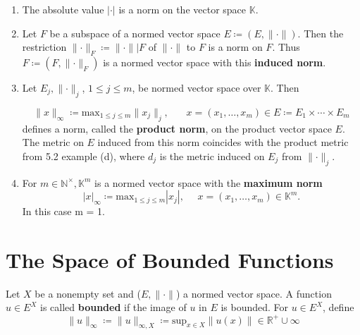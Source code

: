 \begin{eg}
    \begin{enumerate}[label=(\alph*)]
        \item The absolute value \(|\cdot|\) is a norm on the vector space \(\mathbb{K}\). 
        \item Let \(F\) be a subspace of a normed vector space 
        \(E \coloneqq \left(E, \lVert \cdot \rVert \right)\). Then the restriction 
        \(\lVert \cdot \rVert_F \coloneqq  \lVert \cdot \rVert | F\) of 
        \(\lVert \cdot \rVert\) to \(F\) is a norm on \(F\). Thus 
        \(F \coloneqq \left(F, \lVert \cdot \rVert_F\right)\) is a normed vector space 
        with this \textbf{induced norm}. 
        \item Let \(E_j, \lVert \cdot \rVert_j\), \(1 \leq j \leq m\), be normed vector 
        space over \(\mathbb{K}\). Then

        \[
            \lVert x \rVert_\infty \coloneqq \displaystyle{\text{max}_{1\leq j\leq m}}
            \lVert x_j \rVert_j, \:\:\:\:\:\:\:\: x = (x_1,\ldots,x_m) \in E \coloneqq
            E_1 \times \cdots \times E_m   
        \]
        defines a norm, called the \textbf{product norm}, on the product vector space 
        \(E\). The metric on \(E\) induced from this norm coincides with the product metric
        from 5.2 example (d), where \(d_j\) is the metric induced on \(E_j\) from 
        \(\lVert \cdot \rVert_j\). 
        \item For \(m \in \mathbb{N}^\times, \mathbb{K}^m \) is a normed vector space
        with the \textbf{maximum norm}
        \[
            |x|_\infty \coloneqq  \text{max}_{1 \leq j \leq m} |x_j|, \:\:\:\:\:\:
            x = (x_1,\ldots, x_m) \in \mathbb{K}^m.   
        \] 
        In this case m = 1. 
    \end{enumerate}
\end{eg}

\section{The Space of Bounded Functions}

Let \(X\) be a nonempty set and (\(E, \lVert \cdot \rVert\)) a normed vector space. A function
\(u \in E^X\) is called \textbf{bounded} if the image of \(u\) in \(E\) is bounded. For 
\(u \in E^X\), define 
\[
    \lVert u \rVert_\infty \coloneqq \lVert u \rVert_{\infty,X} \coloneqq 
    \displaystyle{\text{sup}_{x\in X}} \lVert u(x) \rVert \in \mathbb{R}^+ \cup {\infty}
\]

